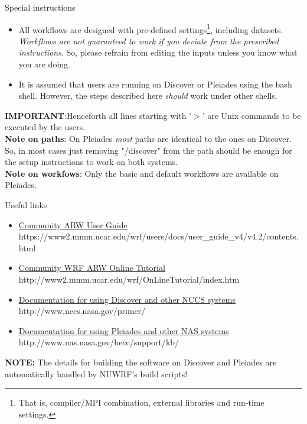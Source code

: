 \begin{frame}{Special instructions}

\footnotesize{
\begin{itemize}
\item All workflows are designed with pre-defined settings\footnote{That is, compiler/MPI combination, external libraries and run-time settings.}, including datasets. \emph{Workflows are not guaranteed to work if you deviate from the prescribed instructions}. So, please refrain from editing the inputs unless you know what you are doing. 
\item It is assumed that users are running on Discover or Pleiades using the bash shell. However, the steps described here \emph{should} work under other shells.
\end{itemize}
}
\textbf{IMPORTANT}:Henceforth all lines starting with '$>$' are Unix commands to be executed by the users.\\
\textbf{Note on paths}: On Pleiades \emph{most} paths are identical to the ones on Discover. So, in most cases just removing  "/discover" from the path should be enough for the setup instructions to work on both systems.\\
\textbf{Note on workfows}: Only the basic and default workflows are available on Pleiades.\\

\end{frame}


\begin{frame}{Useful links}

\footnotesize{
\begin{itemize}
\item \href{https://www2.mmm.ucar.edu/wrf/users/docs/user_guide_v4/v4.2/contents.html}{Community ARW User Guide} https://www2.mmm.ucar.edu/wrf/users/docs/user\_guide\_v4/v4.2/contents.html
\item \href{http://www2.mmm.ucar.edu/wrf/OnLineTutorial/index.htm}{Community WRF ARW Online Tutorial} http://www2.mmm.ucar.edu/wrf/OnLineTutorial/index.htm
\item \href{http://www.nccs.nasa.gov/primer/}{Documentation for using Discover and other NCCS systems} http://www.nccs.nasa.gov/primer/
\item \href{http://www.nas.nasa.gov/hecc/support/kb//}{Documentation for using Pleiades and other NAS systems} http://www.nas.nasa.gov/hecc/support/kb/
\end{itemize}
\textbf{NOTE:} The details for building the software on Discover and Pleiades are automatically handled by 
NUWRF's build scripts!
}

\end{frame}

